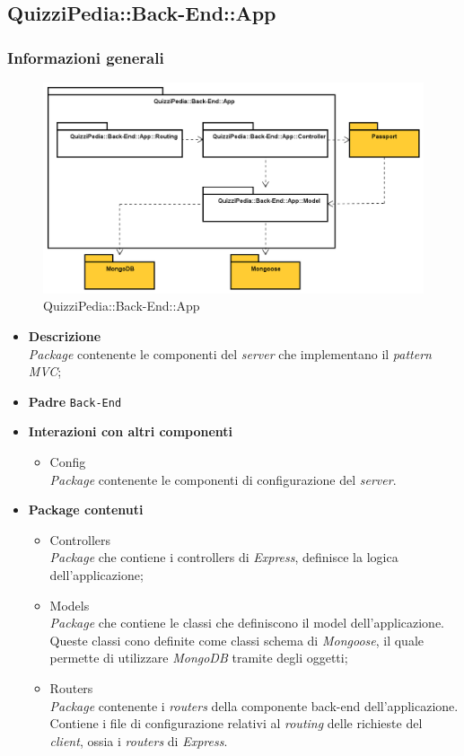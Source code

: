 \subsection{QuizziPedia::Back-End::App}
\subsubsection{Informazioni generali}
\label{QuizziPedia::Back-End::App}
\begin{figure}
	\centering
	\includegraphics[scale=0.45]{UML/Package/QuizziPedia_Back-End_App.png}
	\caption{QuizziPedia::Back-End::App}
\end{figure}
\FloatBarrier
	\begin{itemize}
		\item \textbf{Descrizione} \\
		\textit{Package} contenente le componenti del \textit{server} che implementano il \textit{pattern\ped{G} MVC};
		\item \textbf{Padre} \texttt{Back-End}
		\item \textbf{Interazioni con altri componenti}
			\begin{itemize}
				\item Config \\
				\textit{Package} contenente le componenti di configurazione del \textit{server}.
			\end{itemize}
		\item \textbf{Package contenuti}
			\begin{itemize}
				\item Controllers \\
				\textit{Package} che contiene i controllers di \textit{Express}, definisce la logica dell'applicazione;
				\item Models \\
				\textit{Package} che contiene le classi che definiscono il model dell'applicazione. Queste classi cono definite come classi schema di \textit{Mongoose}, il quale permette di utilizzare \textit{MongoDB} tramite degli oggetti;
				\item Routers \\
				\textit{Package} contenente i \textit{routers} della componente back-end dell'applicazione. Contiene i file di configurazione relativi al \textit{routing} delle richieste del \textit{client}, ossia i \textit{routers} di \textit{Express}.
			\end{itemize}
	\end{itemize}